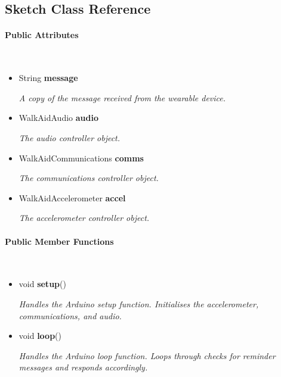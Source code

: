 \subsection{Sketch Class Reference}
\label{subsec:sketch}\mbox{}

    \paragraph{Public Attributes}\mbox{}\\

        \begin{itemize}
            \item String \textbf{message}
            
                \quad \quad \textit{A copy of the message received from the wearable device.}

            \item WalkAidAudio \textbf{audio}
            
                \quad \quad \textit{The audio controller object.}

            \item WalkAidCommunications \textbf{comms}
            
                \quad \quad \textit{The communications controller object.}
                
            \item WalkAidAccelerometer \textbf{accel}
            
                \quad \quad \textit{The accelerometer controller object.}\\

        \end{itemize}


    \paragraph{Public Member Functions}\mbox{}\\

        \begin{itemize}
            \item void \textbf{setup}() 
            
                \quad \quad \textit{Handles the Arduino setup function. Initialises the accelerometer, communications, and audio.}

            \item void \textbf{loop}() 
            
                \quad \quad \textit{Handles the Arduino loop function. Loops through checks for reminder messages and responds accordingly.}\\
        \end{itemize}


